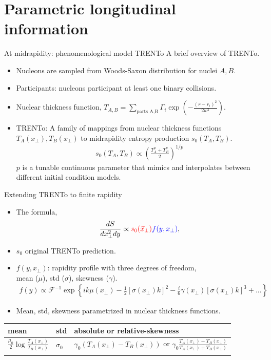 \documentclass[11pt]{beamer}
\begin{document}
\section{Parametric longitudinal information}
\begin{frame}{At midrapidity: phenomenological model TRENTo }
A brief overview of TRENTo.
\begin{itemize}
\item Nucleons are sampled from Woods-Saxon distribution for nuclei $A, B$.
\item Participants: nucleons participant at least one binary collisions.
\item Nuclear thickness function, $T_{A, B} = \sum_{\textrm{parts A,B}} \Gamma_i \exp\left(-\frac{(r-r_i)^2}{2w^2}\right)$.
\item TRENTo: A family of mappings from nuclear thickness functions $T_A(x_\perp), T_B(x_\perp)$ to midrapidity entropy production $s_0(T_A, T_B)$.
\begin{eqnarray}
\nonumber
s_0(T_A, T_B) \propto \left(\frac{T_A^p + T_B^p}{2}\right)^{1/p}
\end{eqnarray}
$p$ is a tunable continuous parameter that mimics and interpolates between different initial condition models.
\end{itemize}
\end{frame}

\begin{frame}{Extending TRENTo to finite rapidity}
\begin{itemize}
\item The formula,
\begin{eqnarray}\nonumber 
\frac{dS}{dx_\perp^2d y} \propto {\color{red} s_0(\vec{x}_\perp)} {\color{blue}f(y, x_\perp)},
\end{eqnarray} 
\item $s_0$ original TRENTo prediction.
\item {\color{blue} $f(y, x_\perp)$}: rapidity profile with three degrees of freedom,\\
mean ($\mu$), std ($\sigma$), skewness ($\gamma$).
\begin{eqnarray}\nonumber 
f(y) \propto \mathcal{F}^{-1}\exp\left\{ik\mu(x_\perp) -\frac{1}{2}[\sigma(x_\perp) k]^2 - \frac{i}{6}\gamma(x_\perp)[\sigma(x_\perp) k]^3 + ...\right\}
\end{eqnarray}
\item Mean, std, skewness parametrized in nuclear thickness functions.
\end{itemize}
\begin{center}
\begin{tabularx}{0.95\textwidth}{p{2.5cm}p{}p{8cm}}
\hline
mean & std & absolute or relative-skewness \\
\hline
\noalign{\smallskip}
$\frac{\mu_0}{2} \log\frac{T_A(x_\perp)}{T_B(x_\perp)}$ & $\sigma_0$ & $\gamma_0(T_A(x_\perp)-T_B(x_\perp))$ or $\gamma_0\frac{T_A(x_\perp)-T_B(x_\perp)}{T_A(x_\perp)+T_B(x_\perp)}$ \\
\noalign{\smallskip}
\hline
\end{tabularx}
\end{center}
\end{frame}
\end{document}
